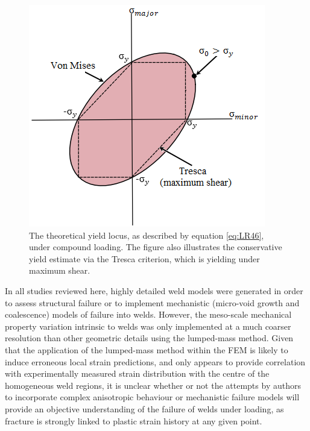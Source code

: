 \begin{figure}[h!]
 	\centering
 	\includegraphics[width=0.5\linewidth]{Figures/LiteratureReview/VonMisesStrain}
 	\caption[Von Mises yield locus]{The theoretical yield locus, as described by equation \ref{eq:LR46}, under compound loading. The figure also illustrates the conservative yield estimate via the Tresca criterion, which is yielding under maximum shear.}
 	\label{fig:VonMisesStrain}
\end{figure}

In all studies reviewed here, highly detailed weld models were generated in order to assess structural failure or to implement mechanistic (micro-void growth and coalescence) models of failure into welds. However, the meso-scale mechanical property variation intrinsic to welds was only implemented at a much coarser resolution than other geometric details using the lumped-mass method. Given that the application of the lumped-mass method within the FEM is likely to induce erroneous local strain predictions, and only appears to provide correlation with experimentally measured strain distribution with the centre of the homogeneous weld regions, it is unclear whether or not the attempts by authors to incorporate complex anisotropic behaviour \cite{Kim2010,Kim2010a} or mechanistic failure models \cite{Chien2003a} will provide an objective understanding of the failure of welds under loading, as fracture is strongly linked to plastic strain history at any given point. 

